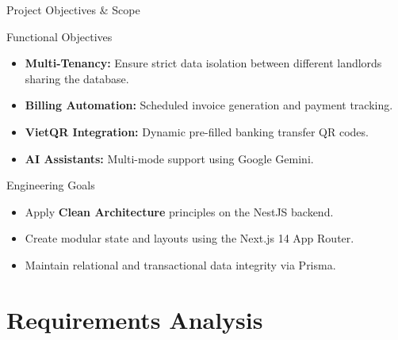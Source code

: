 \documentclass[10pt]{beamer}
\begin{document}
\begin{frame}{Project Objectives \& Scope}
    \begin{block}{Functional Objectives}
        \begin{itemize}
            \item \textbf{Multi-Tenancy:} Ensure strict data isolation between different landlords sharing the database.
            \item \textbf{Billing Automation:} Scheduled invoice generation and payment tracking.
            \item \textbf{VietQR Integration:} Dynamic pre-filled banking transfer QR codes.
            \item \textbf{AI Assistants:} Multi-mode support using Google Gemini.
        \end{itemize}
    \end{block}
    
    \begin{block}{Engineering Goals}
        \begin{itemize}
            \item Apply \textbf{Clean Architecture} principles on the NestJS backend.
            \item Create modular state and layouts using the Next.js 14 App Router.
            \item Maintain relational and transactional data integrity via Prisma.
        \end{itemize}
    \end{block}
\end{frame}


\section{Requirements Analysis}
\end{document}

